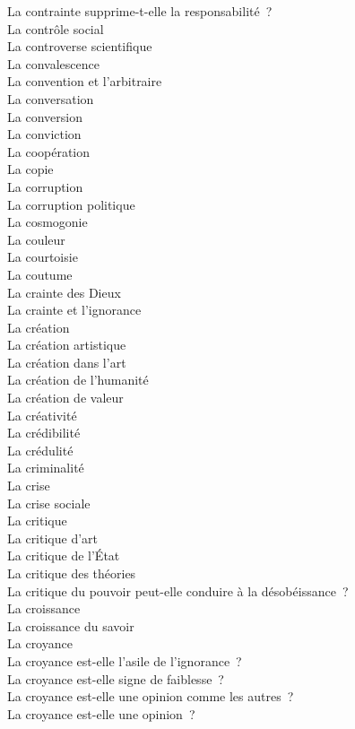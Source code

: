 \documentclass[a4paper,12pt]{article}
\begin{document}
La contrainte supprime-t-elle la responsabilité ? \\
La contrôle social \\
La controverse scientifique \\
La convalescence \\
La convention et l'arbitraire \\
La conversation \\
La conversion \\
La conviction \\
La coopération \\
La copie \\
La corruption \\
La corruption politique \\
La cosmogonie \\
La couleur \\
La courtoisie \\
La coutume \\
La crainte des Dieux \\
La crainte et l'ignorance \\
La création \\
La création artistique \\
La création dans l'art \\
La création de l'humanité \\
La création de valeur \\
La créativité \\
La crédibilité \\
La crédulité \\
La criminalité \\
La crise \\
La crise sociale \\
La critique \\
La critique d'art \\
La critique de l'État \\
La critique des théories \\
La critique du pouvoir peut-elle conduire à la désobéissance ? \\
La croissance \\
La croissance du savoir \\
La croyance \\
La croyance est-elle l'asile de l'ignorance ? \\
La croyance est-elle signe de faiblesse ? \\
La croyance est-elle une opinion comme les autres ? \\
La croyance est-elle une opinion ? \\
\end{document}
